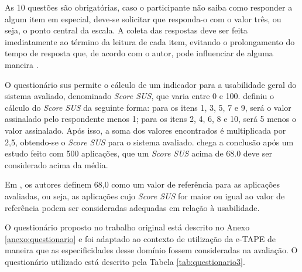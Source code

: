 \par
 As 10 questões são obrigatórias, caso o participante não saiba como responder a algum item em especial, deve-se solicitar que responda-o com o valor três, ou seja, o ponto central da escala. A coleta das respostas 
deve ser feita imediatamente ao término da leitura de cada item, evitando o prolongamento do tempo de resposta que, de acordo com o autor, pode influenciar de alguma maneira \cite{brooke1996sus}.

\par

O questionário \acrshort{sus} permite o cálculo de um indicador para a usabilidade geral do sistema avaliado, denominado \textit{Score SUS}, que varia entre 0 e 100. 
 definiu o cálculo do \textit{Score SUS} da seguinte forma:
para os itens 1, 3, 5, 7 e 9, será o valor assinalado pelo respondente menos 1; para os itens 2, 4, 6, 8 e 10, será 5 menos o valor assinalado. Após isso, a soma dos valores 
encontrados é multiplicada por 2,5, obtendo-se o \textit{Score SUS} para o sistema avaliado.  chega a conclusão após um estudo feito com 500 aplicações, 
que um \textit{Score SUS} acima de 68.0 deve ser considerado acima da média.
\par
Em , os autores definem 68,0 como um valor de referência para as aplicações avaliadas, ou seja, as aplicações cujo \textit{Score SUS} for maior ou igual ao valor de referência podem ser consideradas adequadas em relação à usabilidade.

\par
O questionário proposto no trabalho original está descrito no Anexo \ref{anexo:questionario} e foi adaptado ao contexto de utilização da e-TAPE de maneira que as especificidades desse domínio fossem consideradas na avaliação. 
O questionário utilizado está descrito pela Tabela \ref{tab:questionario3}.

